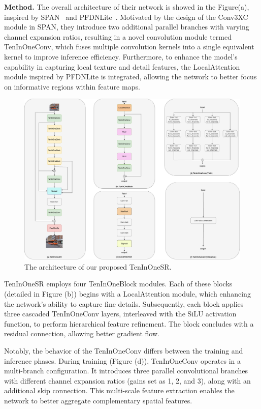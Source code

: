 \documentclass[10pt,twocolumn,letterpaper]{article}
\begin{document}
\textbf{Method. } The overall architecture of their network is showed in the Figure(a), inspired by SPAN~\cite{SPAN2024} and PFDNLite~\cite{NTIRE2024Report}. Motivated by the design of the Conv3XC module in SPAN, they introduce two additional parallel branches with varying channel expansion ratios, resulting in a novel convolution module termed TenInOneConv, which fuses multiple convolution kernels into a single equivalent kernel to improve inference efficiency. Furthermore, to enhance the model’s capability in capturing local texture and detail features, the LocalAttention module inspired by PFDNLite is integrated, allowing the network to better focus on informative regions within feature maps. 
\begin{figure}[t]
  \centering
  \includegraphics[width=\linewidth]{figure.png}
  \caption{The architecture of our proposed TenInOneSR.}
  \label{fig:architecture}
\end{figure}


TenInOneSR employs four TenInOneBlock modules. Each of these blocks (detailed in Figure (b)) begins with a LocalAttention module, which enhancing the network’s ability to capture fine details. Subsequently, each block applies three cascaded TenInOneConv layers, interleaved with the SiLU activation function, to perform hierarchical feature refinement. The block concludes with a residual connection, allowing better gradient flow.

Notably, the behavior of the TenInOneConv differs between the training and inference phases. During training (Figure (d)), TenInOneConv operates in a multi-branch configuration. It introduces three parallel convolutional branches with different channel expansion ratios (gains set as 1, 2, and 3), along with an additional skip connection. This multi-scale feature extraction enables the network to better aggregate complementary spatial features.
\end{document}
